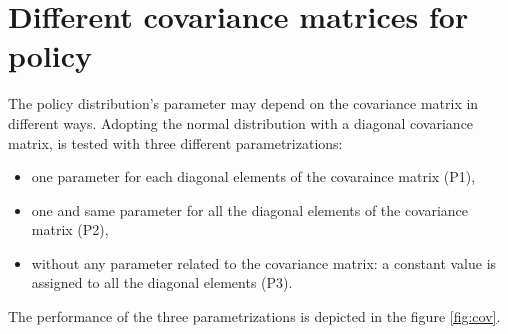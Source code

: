 



%

\section{Different covariance matrices for policy}
The policy distribution's parameter may depend on the covariance matrix in different ways. Adopting the normal distribution with a diagonal covariance matrix, \ppo is tested with three different parametrizations:
\begin{itemize}
	\item one parameter for each diagonal elements of the covaraince matrix (P1),
	\item one and same parameter for all the diagonal elements of the covariance matrix (P2),
	\item without any parameter related to the covariance matrix: a constant value is assigned to all the diagonal elements (P3).
\end{itemize}
The performance of the three parametrizations is depicted in the figure \ref{fig:cov}.
%

